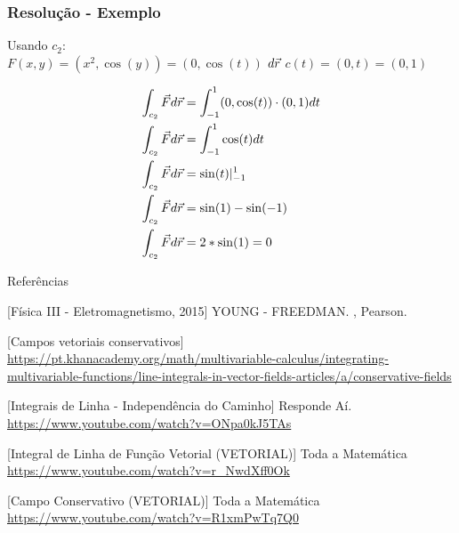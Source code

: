 \documentclass{beamer}
\def\vec{\mathaccent "017E\relax }
\begin{document}
\begin{frame}
    \frametitle{Resolução - Exemplo} 
    Usando $ c_2 $: \\
    
    $ F(x, y) = ( x^2, \cos(y) ) = ( 0, \cos(t) ) $
    \hfill \break
    $ d\vec{r} $
    \hfill \break
    $ c(t) = ( 0, t ) = ( 0, 1 ) $
    \hfill \break
    
    \begin{align*}   
    \int_{c_2} \vec{F} d\vec{r} &= \int_{-1}^1 (0, \cos(t) ) \cdot ( 0, 1 ) dt \\
    \int_{c_2} \vec{F} d\vec{r} &= \int_{-1}^1 \cos(t) dt  \\
    \int_{c_2} \vec{F} d\vec{r} &= \sin(t)\vert_{-1}^{1} \\
    \int_{c_2} \vec{F} d\vec{r} &= \sin(1) - \sin(-1) \\
    \int_{c_2} \vec{F} d\vec{r} &= 2 * \sin(1) = 0 \\
    \end{align*}
    
\end{frame}

\nocite{*}
\begin{frame}{Referências}
    \begin{thebibliography}{10}
        [Física III - Eletromagnetismo, 2015]
        YOUNG - FREEDMAN.
        ,
        \newblock Pearson.
        
        [Campos vetoriais conservativos]
        \newblock \url{https://pt.khanacademy.org/math/multivariable-calculus/integrating-multivariable-functions/line-integrals-in-vector-fields-articles/a/conservative-fields}
             
        [Integrais de Linha - Independência do Caminho]
        \newblock Responde Aí.
        \newblock \url{https://www.youtube.com/watch?v=ONpa0kJ5TAs}
             
        [Integral de Linha de Função Vetorial (VETORIAL)]
        \newblock Toda a Matemática
        \newblock \url{https://www.youtube.com/watch?v=r_NwdXff0Ok}

        [Campo Conservativo (VETORIAL)]
        \newblock Toda a Matemática
        \newblock \url{https://www.youtube.com/watch?v=R1xmPwTq7Q0}
        
    \end{thebibliography}
\end{frame}
\end{document}
